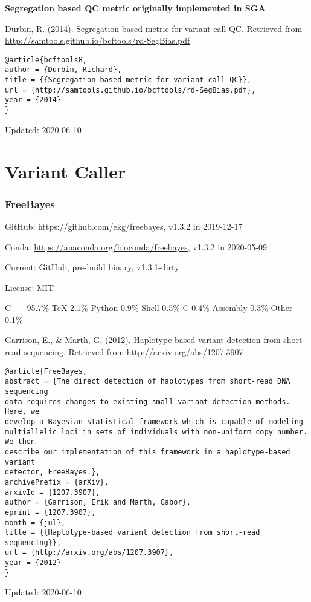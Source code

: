\documentclass[]{article}
\begin{document}
\textbf{Segregation based QC metric originally implemented in SGA}

Durbin, R. (2014). Segregation based metric for variant call QC. Retrieved from \url{http://samtools.github.io/bcftools/rd-SegBias.pdf}

\begin{verbatim}
@article{bcftools8,
author = {Durbin, Richard},
title = {{Segregation based metric for variant call QC}},
url = {http://samtools.github.io/bcftools/rd-SegBias.pdf},
year = {2014}
}
\end{verbatim}

Updated: 2020-06-10

\part{Variant Caller}
\section{FreeBayes}

GitHub: \url{https://github.com/ekg/freebayes}, v1.3.2 in 2019-12-17

Conda: \url{https://anaconda.org/bioconda/freebayes}, v1.3.2 in 2020-05-09

Current: GitHub, pre-build binary, v1.3.1-dirty

License: MIT

C++ 95.7\% TeX 2.1\% Python 0.9\% Shell 0.5\% C 0.4\% Assembly 0.3\% Other 0.1\%

Garrison, E., \& Marth, G. (2012). Haplotype-based variant detection from short-read sequencing. Retrieved from \url{http://arxiv.org/abs/1207.3907}

\begin{verbatim}
@article{FreeBayes,
abstract = {The direct detection of haplotypes from short-read DNA sequencing
data requires changes to existing small-variant detection methods. Here, we
develop a Bayesian statistical framework which is capable of modeling
multiallelic loci in sets of individuals with non-uniform copy number. We then
describe our implementation of this framework in a haplotype-based variant
detector, FreeBayes.},
archivePrefix = {arXiv},
arxivId = {1207.3907},
author = {Garrison, Erik and Marth, Gabor},
eprint = {1207.3907},
month = {jul},
title = {{Haplotype-based variant detection from short-read sequencing}},
url = {http://arxiv.org/abs/1207.3907},
year = {2012}
}
\end{verbatim}

Updated: 2020-06-10
\end{document}
